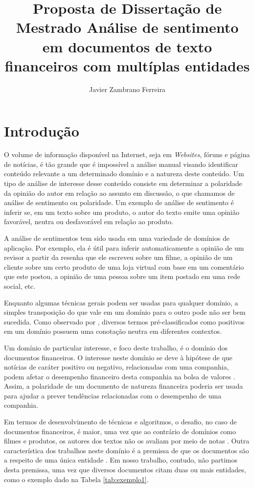 \documentclass[a4paper,12pt]{article}
\title{\textbf{Proposta de Dissertação de Mestrado}
Análise de sentimento em documentos de texto financeiros com multíplas entidades}
\author{Javier Zambrano Ferreira}
\begin{document}
 

\section{Introdução}

O volume de informação disponível na Internet, seja em \textit{Websites}, fóruns e página de notícias, é tão grande que é impossível a análise manual visando identificar conteúdo relevante a um determinado domínio e a natureza deste conteúdo. Um tipo de análise de interesse desse conteúdo consiste em determinar a polaridade da opinião do autor em relação ao assunto em discussão, o que chamamos de análise de sentimento ou polaridade. Um exemplo de análise de sentimento é inferir se, em um texto sobre um produto, o autor do texto emite uma opinião favorável, neutra ou desfavorável em relação ao produto. 

A análise de sentimentos tem sido usada em uma variedade de domínios de aplicação. Por exemplo, ela é útil para inferir automaticamente a opinião de um revisor a partir da resenha que ele escreveu sobre um filme, a opinião de um cliente sobre um certo produto de uma loja virtual com base em um comentário que este postou, a opinião de uma pessoa sobre um item postado em uma rede social, etc.

Enquanto algumas técnicas gerais podem ser usadas para qualquer domínio, a simples transposição do que vale em um domínio para o outro pode não ser bem sucedida. Como observado por \cite{contextualpolarity}, diversos termos pré-classificados como positivos em um domínio possuem uma conotação neutra em diferentes contextos.

Um domínio de particular interesse, e foco deste trabalho, é o domínio dos documentos financeiros. O interesse neste domínio se deve à hipótese de que notícias de caráter positivo ou negativo, relacionadas com uma companhia, podem afetar o desempenho financeiro desta companhia na bolsa de valores \cite{pablotese,jbhx,lexiconAA}. Assim, a polaridade de um documento de natureza financeira poderia ser usada para ajudar a prever tendências relacionadas com o desempenho de uma companhia. 

Em termos de desenvolvimento de técnicas e algoritmos, o desafio, no caso de documentos financeiros, é maior, uma vez que ao contrário de domínios como filmes e produtos, os autores dos textos não os avaliam por meio de notas \cite{pablotese}. Outra característica dos trabalhos neste domínio é a premissa de que os documentos são a respeito de uma única entidade \cite{pablotese,jbhx,azsystem}. Em nosso trabalho, contudo, não partimos desta premissa, uma vez que diversos documentos citam duas ou mais entidades, como o exemplo dado na Tabela \ref{tab:exemplo1}. 
\end{document}
